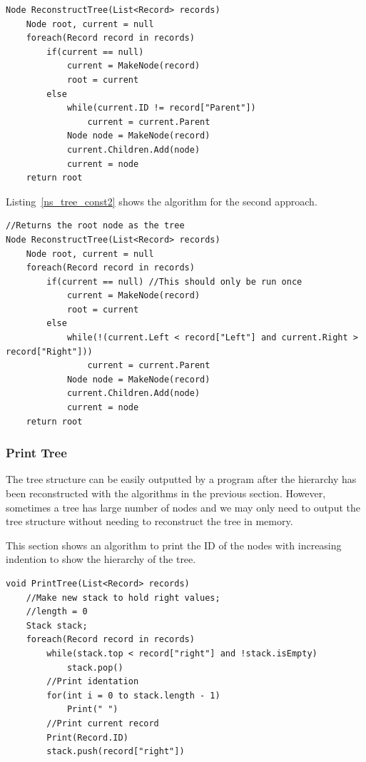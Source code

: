 \begin{minipage}{\linewidth}
\begin{lstlisting}[frame=single]
Node ReconstructTree(List<Record> records)
	Node root, current = null
	foreach(Record record in records)
		if(current == null)
			current = MakeNode(record)
			root = current
		else
			while(current.ID != record["Parent"])
				current = current.Parent
			Node node = MakeNode(record)
			current.Children.Add(node)
			current = node
	return root
\end{lstlisting}	
\end{minipage}

Listing~\ref{ns_tree_const2} shows the algorithm for the second approach.

\begin{minipage}{\linewidth}
\begin{lstlisting}[frame=single]
//Returns the root node as the tree
Node ReconstructTree(List<Record> records)
	Node root, current = null
	foreach(Record record in records)
		if(current == null) //This should only be run once
			current = MakeNode(record)
			root = current
		else
			while(!(current.Left < record["Left"] and current.Right > record["Right"]))
				current = current.Parent
			Node node = MakeNode(record)
			current.Children.Add(node)
			current = node
	return root
\end{lstlisting}	
\end{minipage}
\subsubsection{Print Tree}

The tree structure can be easily outputted by a program after the hierarchy has been reconstructed with the algorithms in the previous section. However, sometimes a tree has large number of nodes and we may only need to output the tree structure without needing to reconstruct the tree in memory.

This section shows an algorithm to print the ID of the nodes with increasing indention to show the hierarchy of the tree.

\begin{minipage}{\linewidth}
\begin{lstlisting}[frame=single]
void PrintTree(List<Record> records)
	//Make new stack to hold right values; 
	//length = 0
	Stack stack;
	foreach(Record record in records)
		while(stack.top < record["right"] and !stack.isEmpty)
			stack.pop()
		//Print identation
		for(int i = 0 to stack.length - 1) 
			Print(" ")
		//Print current record
		Print(Record.ID)
		stack.push(record["right"])
\end{lstlisting}	
\end{minipage}
